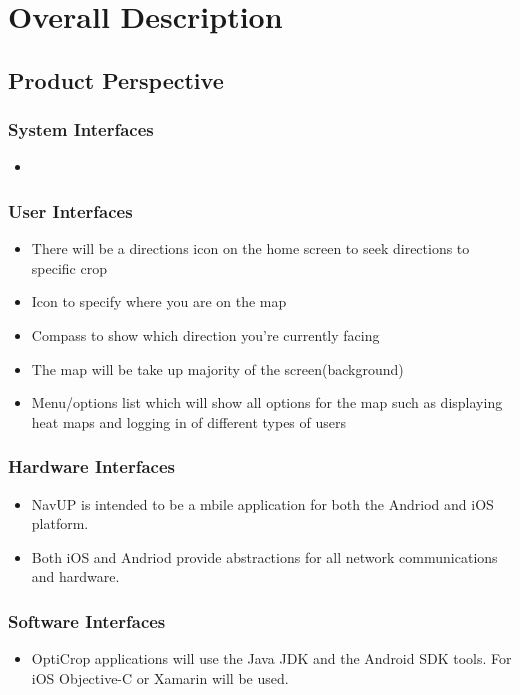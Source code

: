 \documentclass[runningheads,a4paper]{article}
\begin{document}
\section{Overall Description}

\subsection{Product Perspective}

\subsubsection{System Interfaces}
\begin{itemize}
	\item 
\end{itemize}
\subsubsection{User Interfaces}
\begin{itemize}
	\item 	There will be a directions icon on the home screen to seek directions to specific crop
	\item 	Icon to specify where you are on the map
	\item Compass to show which direction you’re currently facing
	\item The map will be take up majority of the screen(background)
	\item Menu/options list which will show all options for the map such as displaying heat maps and logging in of different types of users
	
\end{itemize}
\subsubsection{Hardware Interfaces}
\begin{itemize}
	\item	NavUP is intended to be a mbile application for both the Andriod and iOS platform.
	\item Both iOS and Andriod provide abstractions for all network communications and hardware.
	
	
\end{itemize}
\subsubsection{Software Interfaces}
\begin{itemize}
	\item OptiCrop applications will use the Java JDK and the Android SDK tools. For iOS Objective-C or Xamarin will be used.
	
\end{itemize}
\end{document}
